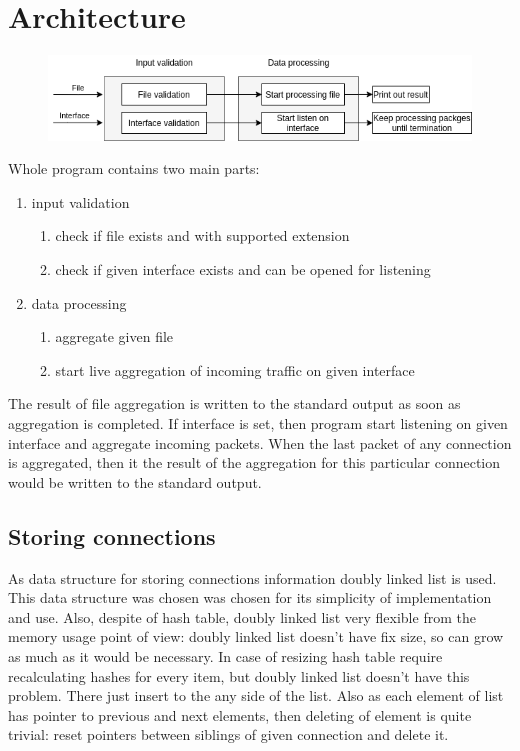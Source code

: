 \documentclass[12pt,a4paper]{article}
\begin{document}
    \section{Architecture}
    \begin{center}
        \begin{figure}[h!]
            \includegraphics[scale=0.7]{sslsniff.png}
        \end{figure}
    \end{center}
    Whole program contains two main parts:
    \begin{enumerate}
        \item input validation
        \begin{enumerate}
            \item check if file exists and with supported extension
            \item check if given interface exists and can be opened for listening
        \end{enumerate}
        \item data processing
        \begin{enumerate}
            \item aggregate given file
            \item start live aggregation of incoming traffic on given interface
        \end{enumerate}
    \end{enumerate}
    The result of file aggregation is written to the standard output as soon as
    aggregation is completed. 
    If interface is set, then program start listening on given interface and aggregate 
    incoming packets. When the last packet of any connection is aggregated, 
    then it the result of the aggregation for this particular connection would be 
    written to the standard output. 

    \subsection{Storing connections}
    As data structure for storing connections information doubly linked list is used.
    This data structure was chosen was chosen for its simplicity of implementation 
    and use. Also, despite of hash table, doubly linked list very flexible from
    the memory usage point of view: doubly linked list doesn't have fix size, so
    can grow as much as it would be necessary. In case of resizing hash table 
    require recalculating hashes for every item, but doubly linked list doesn't
    have this problem. There just insert to the any side of the list. Also as 
    each element of list has pointer to previous and next elements, then deleting
    of element is quite trivial: reset pointers between siblings of given connection
    and delete it.
\end{document}
